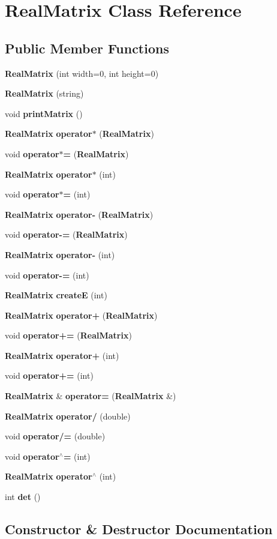 \section{Real\+Matrix Class Reference}
\label{class_real_matrix}
\subsection*{Public Member Functions}
\begin{DoxyCompactItemize}
\item 
{\bf Real\+Matrix} (int width=0, int height=0)
\item 
{\bf Real\+Matrix} (string)
\item 
void {\bf print\+Matrix} ()
\item 
{\bf Real\+Matrix} {\bf operator$\ast$} ({\bf Real\+Matrix})
\item 
void {\bf operator$\ast$=} ({\bf Real\+Matrix})
\item 
{\bf Real\+Matrix} {\bf operator$\ast$} (int)
\item 
void {\bf operator$\ast$=} (int)
\item 
{\bf Real\+Matrix} {\bf operator-\/} ({\bf Real\+Matrix})
\item 
void {\bf operator-\/=} ({\bf Real\+Matrix})
\item 
{\bf Real\+Matrix} {\bf operator-\/} (int)
\item 
void {\bf operator-\/=} (int)
\item 
{\bf Real\+Matrix} {\bf create\+E} (int)
\item 
{\bf Real\+Matrix} {\bf operator+} ({\bf Real\+Matrix})
\item 
void {\bf operator+=} ({\bf Real\+Matrix})
\item 
{\bf Real\+Matrix} {\bf operator+} (int)
\item 
void {\bf operator+=} (int)
\item 
{\bf Real\+Matrix} \& {\bf operator=} ({\bf Real\+Matrix} \&)
\item 
{\bf Real\+Matrix} {\bf operator/} (double)
\item 
void {\bf operator/=} (double)
\item 
void {\bf operator$^\wedge$=} (int)
\item 
{\bf Real\+Matrix} {\bf operator$^\wedge$} (int)
\item 
int {\bf det} ()
\end{DoxyCompactItemize}


\subsection{Constructor \& Destructor Documentation}
